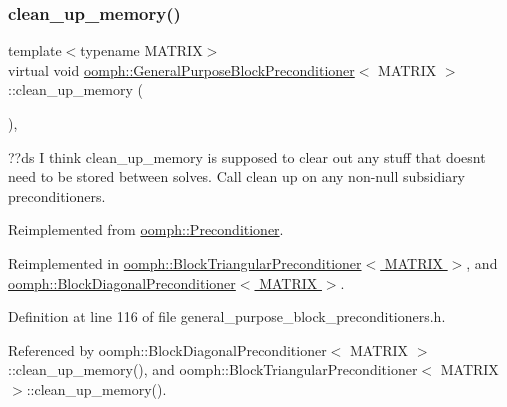 \subsubsection{\texorpdfstring{clean\+\_\+up\+\_\+memory()}{clean\_up\_memory()}}
{\footnotesize\ttfamily template$<$typename M\+A\+T\+R\+IX$>$ \\
virtual void \hyperlink{classoomph_1_1GeneralPurposeBlockPreconditioner}{oomph\+::\+General\+Purpose\+Block\+Preconditioner}$<$ M\+A\+T\+R\+IX $>$\+::clean\+\_\+up\+\_\+memory (\begin{DoxyParamCaption}{ }\end{DoxyParamCaption})\hspace{0.3cm}{\ttfamily [inline]}, {\ttfamily [virtual]}}



??ds I think clean\+\_\+up\+\_\+memory is supposed to clear out any stuff that doesn\textquotesingle{}t need to be stored between solves. Call clean up on any non-\/null subsidiary preconditioners. 



Reimplemented from \hyperlink{classoomph_1_1Preconditioner_a46c31c416829bedcd9db238431262027}{oomph\+::\+Preconditioner}.



Reimplemented in \hyperlink{classoomph_1_1BlockTriangularPreconditioner_aec59a3bb131cd924d3efa6873a187a0f}{oomph\+::\+Block\+Triangular\+Preconditioner$<$ M\+A\+T\+R\+I\+X $>$}, and \hyperlink{classoomph_1_1BlockDiagonalPreconditioner_aced1bed34b9f6a11903d5fd3ae42ece8}{oomph\+::\+Block\+Diagonal\+Preconditioner$<$ M\+A\+T\+R\+I\+X $>$}.



Definition at line 116 of file general\+\_\+purpose\+\_\+block\+\_\+preconditioners.\+h.



Referenced by oomph\+::\+Block\+Diagonal\+Preconditioner$<$ M\+A\+T\+R\+I\+X $>$\+::clean\+\_\+up\+\_\+memory(), and oomph\+::\+Block\+Triangular\+Preconditioner$<$ M\+A\+T\+R\+I\+X $>$\+::clean\+\_\+up\+\_\+memory().

\mbox{\label{classoomph_1_1GeneralPurposeBlockPreconditioner_aba4af808888e35785cce631722c926cd}} 
